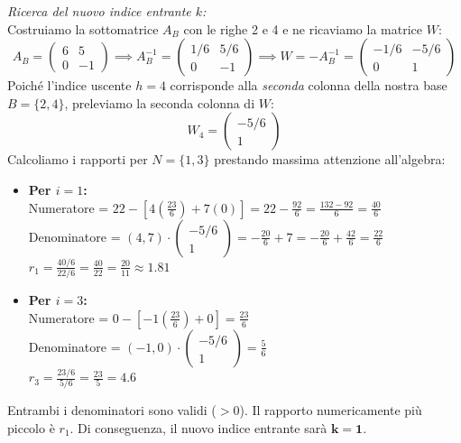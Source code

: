 \documentclass[12pt, a4paper]{article}
\begin{document}
	\textit{Ricerca del nuovo indice entrante $k$:}\\
	Costruiamo la sottomatrice $A_B$ con le righe 2 e 4 e ne ricaviamo la matrice $W$:
	\[
	A_B = \begin{pmatrix} 6 & 5 \\ 0 & -1 \end{pmatrix} \implies A_B^{-1} = \begin{pmatrix} 1/6 & 5/6 \\ 0 & -1 \end{pmatrix} \implies W = -A_B^{-1} = \begin{pmatrix} -1/6 & -5/6 \\ 0 & 1 \end{pmatrix}
	\]
	Poiché l'indice uscente $h=4$ corrisponde alla \textit{seconda} colonna della nostra base $B=\{2,4\}$, preleviamo la seconda colonna di $W$:
	\[
	W_4 = \begin{pmatrix} -5/6 \\ 1 \end{pmatrix}
	\]
	Calcoliamo i rapporti per $N = \{1, 3\}$ prestando massima attenzione all'algebra:
	\begin{itemize}[label=$\circ$, itemsep=4pt, leftmargin=1.5cm]
		\item \textbf{Per $i=1$:} \\ 
		Numeratore = $22 - \left[4\left(\frac{23}{6}\right) + 7(0)\right] = 22 - \frac{92}{6} = \frac{132 - 92}{6} = \frac{40}{6}$ \\
		Denominatore = $(4, 7) \cdot \begin{pmatrix} -5/6 \\ 1 \end{pmatrix} = -\frac{20}{6} + 7 = -\frac{20}{6} + \frac{42}{6} = \frac{22}{6}$ \\
		$r_1 = \frac{40/6}{22/6} = \frac{40}{22} = \frac{20}{11} \approx 1.81$
		
		\item \textbf{Per $i=3$:} \\ 
		Numeratore = $0 - \left[-1\left(\frac{23}{6}\right) + 0\right] = \frac{23}{6}$ \\
		Denominatore = $(-1, 0) \cdot \begin{pmatrix} -5/6 \\ 1 \end{pmatrix} = \frac{5}{6}$ \\
		$r_3 = \frac{23/6}{5/6} = \frac{23}{5} = 4.6$
	\end{itemize}
	Entrambi i denominatori sono validi ($>0$). Il rapporto numericamente più piccolo è $r_1$. Di conseguenza, il nuovo indice entrante sarà $\mathbf{k = 1}$. 
	
\end{document}
